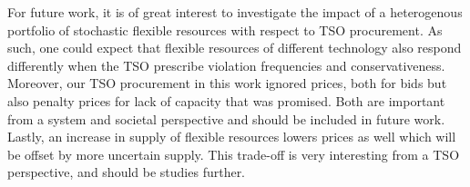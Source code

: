 \documentclass[conference]{IEEEtran}
\begin{document}
For future work, it is of great interest to investigate the impact of a heterogenous portfolio of stochastic flexible resources with respect to \ac{TSO} procurement. As such, one could expect that flexible resources of different technology also respond differently when the \ac{TSO} prescribe violation frequencies and conservativeness. Moreover, our \ac{TSO} procurement in this work ignored prices, both for bids but also penalty prices for lack of capacity that was promised. Both are important from a system and societal perspective and should be included in future work. Lastly, an increase in supply of flexible resources lowers prices as well which will be offset by more uncertain supply. This trade-off is very interesting from a \ac{TSO} perspective, and should be studies further.






% 



\vfill
\end{document}
